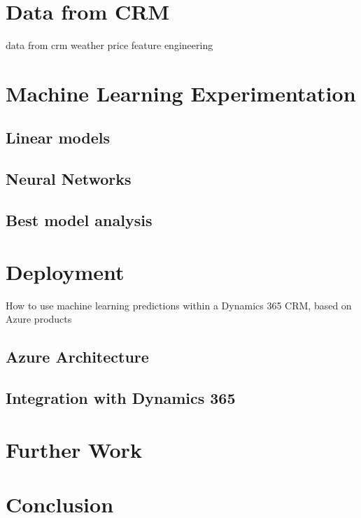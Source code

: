 \section{Data from CRM}

data from crm
weather
price
feature engineering

\lipsum[1]


\section{Machine Learning Experimentation}
\lipsum[1]

\subsection{Linear models}
\lipsum[2]

\subsection{Neural Networks}
\lipsum[3]

\subsection{Best model analysis}
\lipsum[3]


\section{Deployment}
How to use machine learning predictions within a Dynamics 365 CRM, based on Azure products

\subsection{Azure Architecture}
\lipsum[2]

\subsection{Integration with Dynamics 365}
\lipsum[3]


\section{Further Work}
\lipsum[1]

\section{Conclusion}
\lipsum[1]